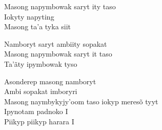 \bigskip

\begin{linenumbers}
\noindent Masong napymbowak saryt ity taso\\
Iokyty napyting\\
Masong ta'a tyka siit
\end{linenumbers}

\bigskip

\begin{linenumbers}
\noindent Namboryt saryt ambiity sopakat\\
Masong napymbowak saryt it taso\\
Ta'ãty ipymbowak tyso
\end{linenumbers}

\bigskip

\begin{linenumbers}
\noindent Asonderep masong namboryt\\
Ambi sopakat imboryri\\
Masong naymbykyjy'oom taso iokyp meresõ tyyt\\
Ipynotam padnoko I\\
Piikyp piikyp harara I
\end{linenumbers}

\bigskip

